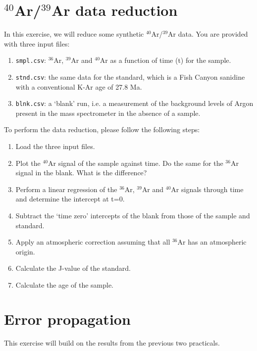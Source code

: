 \documentclass{book}
\begin{document}
\section{$^{40}$Ar/$^{39}$Ar data reduction}
\label{sec:Ar-Ar-R}

In this exercise, we will reduce some synthetic $^{40}$Ar/$^{39}$Ar
data. You are provided with three input files:
\begin{enumerate}
\item{\tt smpl.csv}: $^{36}$Ar, $^{39}$Ar and $^{40}$Ar as a function
  of time (t) for the sample.
\item{\tt stnd.csv}: the same data for the standard, which is a Fish
  Canyon sanidine with a conventional K-Ar age of 27.8 Ma.
\item{\tt blnk.csv}: a `blank' run, i.e. a measurement of the
  background levels of Argon present in the mass spectrometer in the
  absence of a sample.
\end{enumerate}

To perform the data reduction, please follow the following steps:

\begin{enumerate}
\item Load the three input files.
\item Plot the $^{40}$Ar signal of the sample against time. Do the
  same for the $^{36}$Ar signal in the blank. What is the difference?
\item Perform a linear regression of the $^{36}$Ar, $^{39}$Ar and
  $^{40}$Ar signals through time and determine the intercept at t=0.
\item Subtract the `time zero' intercepts of the blank from those of
  the sample and standard.
\item Apply an atmospheric correction assuming that all $^{36}$Ar has
  an atmospheric origin.
\item Calculate the J-value of the standard.
\item Calculate the age of the sample.
\end{enumerate}

\section{Error propagation}
\label{sec:errorprop-R}

This exercise will build on the results from the previous two
practicals.
\end{document}
